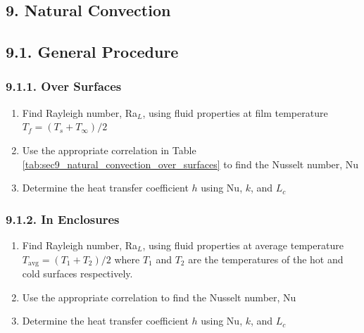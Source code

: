 \begin{multicols*}{2}
\section*{9. Natural Convection}
\subsection*{9.1. General Procedure}
\subsubsection*{9.1.1. Over Surfaces}
\begin{enumerate}
    \item Find Rayleigh number, Ra$_L$, using fluid properties at film temperature $T_f = (T_s + T_\infty)/2$
    \item Use the appropriate correlation in Table \ref{tab:sec9_natural_convection_over_surfaces} 
    to find the Nusselt number, Nu
    \item Determine the heat transfer coefficient $h$ using Nu, $k$, and $L_c$
\end{enumerate}
\subsubsection*{9.1.2. In Enclosures}
\begin{enumerate}
    \item Find Rayleigh number, Ra$_L$, using fluid properties at average temperature $T_{\text{avg}} = (T_1 + T_2)/2$
    where $T_1$ and $T_2$ are the temperatures of the hot and cold surfaces respectively.
    \item Use the appropriate correlation to find the Nusselt number, Nu
    \item Determine the heat transfer coefficient $h$ using Nu, $k$, and $L_c$
\end{enumerate}

\end{multicols*}
